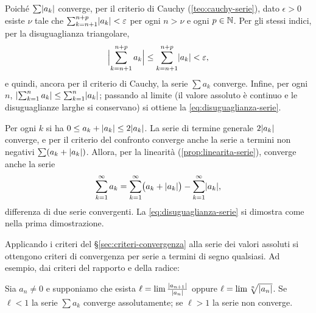 \begin{dimostrazione}
Poiché $\sum\lvert a_{k}\rvert$ converge, per il criterio di Cauchy (\cref{teo:cauchy-serie}), dato
$\epsilon>0$ esiste $\nu$ tale che $\sum_{k=n+1}^{n+p}\lvert a_{k}\rvert<\varepsilon$ per ogni $n>\nu$ e ogni $p\in\mathbb{N}$. Per gli
stessi indici, per la disuguaglianza triangolare,
\[
  \Bigl|\sum_{k=n+1}^{n+p}a_{k}\Bigr|\le\sum_{k=n+1}^{n+p}\lvert a_{k}\rvert<\varepsilon ,
\]
e quindi, ancora per il criterio di Cauchy, la serie $\sum a_{k}$ converge. Infine, per
ogni $n$, $\lvert \sum_{k=1}^{n}a_{k}\rvert\le\sum_{k=1}^{n}\lvert a_{k}\rvert$; passando al limite (il valore assoluto è
continuo e le disuguaglianze larghe si conservano) si ottiene la
\eqref{eq:disuguaglianza-serie}.
\end{dimostrazione}

\begin{dimostrazione}
Per ogni $k$ si ha $0\le a_{k}+\lvert a_{k}\rvert\le2\lvert a_{k}\rvert$. La serie di termine generale $2\lvert a_{k}\rvert$
converge, e per il criterio del confronto converge anche la serie a termini non negativi
$\sum(a_{k}+\lvert a_{k}\rvert)$. Allora, per la linearità (\cref{prop:linearita-serie}), converge
anche la serie
\[
  \sum_{k=1}^{\infty}a_{k}=\sum_{k=1}^{\infty}\bigl(a_{k}+\lvert a_{k}\rvert\bigr)-\sum_{k=1}^{\infty}\lvert a_{k}\rvert ,
\]
differenza di due serie convergenti. La \eqref{eq:disuguaglianza-serie} si dimostra come
nella prima dimostrazione.
\end{dimostrazione}

Applicando i criteri del \S\ref{sec:criteri-convergenza} alla serie dei valori assoluti si
ottengono criteri di convergenza per serie a termini di segno qualsiasi. Ad esempio, dai
criteri del rapporto e della radice:

\begin{corollario}\label{cor:rapporto-assoluto}
Sia $a_{n}\neq0$ e supponiamo che esista $\ell=\lim\frac{\lvert a_{n+1}\rvert}{\lvert a_{n}\rvert}$ oppure
$\ell=\lim\sqrt[n]{\lvert a_{n}\rvert}$. Se $\ell<1$ la serie $\sum a_{k}$ converge assolutamente; se $\ell>1$ la
serie non converge.
\end{corollario}

\begin{schema}
\end{schema}

